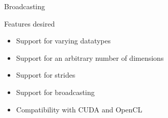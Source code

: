 \documentclass[utf8x,xcolor=pdftex,dvipsnames,table]{beamer}
\begin{document}
\begin{frame}{Broadcasting}
\begin{center}
\end{center}
\end{frame}

\begin{frame}{Features desired}
\begin{itemize}
\item {\color{gray!80} Support for varying datatypes}
\item {\color{gray!80} Support for an arbitrary number of dimensions}
\item {\color{gray!80} Support for strides}
\item {\color{gray!80} Support for broadcasting}
\item Compatibility with CUDA and OpenCL
\end{itemize}
\end{frame}
\end{document}
